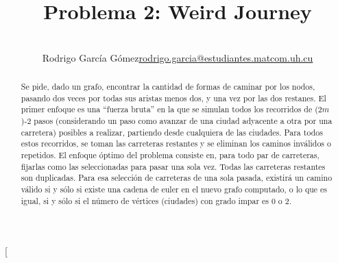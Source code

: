 \documentclass[a4paper,12pt,twocolumn]{article}
\title{Problema 2: Weird Journey}
\author{\\
\name Rodrigo García Gómez\email \href{mailto:rodrigo.garcia@estudiantes.matcom.uh.cu}{rodrigo.garcia@estudiantes.matcom.uh.cu}
}
\begin{document}

\twocolumn[
\maketitle


\begin{abstract}
Se pide, dado un grafo, encontrar la cantidad de formas de caminar por los nodos, pasando dos veces por todas sus aristas menos dos, y una vez por las dos restanes.
El primer enfoque es una “fuerza bruta” en la que se simulan todos los recorridos de (2$m$)-2 pasos (considerando un paso como avanzar de una ciudad adyacente a otra por una carretera) posibles a realizar, partiendo desde cualquiera de las ciudades. Para todos estos recorridos, se toman las carreteras restantes y se eliminan los caminos inválidos o repetidos.
El enfoque óptimo del problema consiste en, para todo par de carreteras, fijarlas como las seleccionadas para pasar una sola vez. Todas las carreteras restantes son duplicadas. Para esa selección de carreteras de una sola pasada, existirá un camino válido si y sólo si existe una cadena de euler en el nuevo grafo computado, o lo que es igual, si y sólo si el número de vértices (ciudades) con grado impar es 0 o 2.
\end{abstract}

\vspace{0.5cm}



\end{document}
